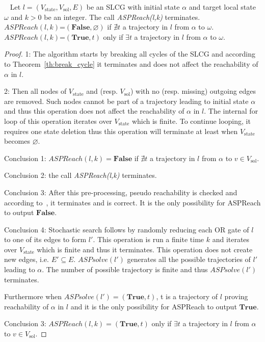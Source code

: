 \begin{theorem} ~
    Let $l=(V_{\mathrm{state}}, V_{\mathrm{sol}}, E)$ be an SLCG with initial state $\alpha$ and target local state $\omega$ and $k > 0$ be an integer.
    The call \textit{ASPReach(l,k)} terminates.\\
    $ASPReach(l,k)$=$(\mathbf{False},\varnothing)$ if $\nexists t$ a trajectory in $l$ from $\alpha$ to $\omega$.\\
    $ASPReach(l,k)$=$(\mathbf{True},t)$ only if $\exists t$ a trajectory in $l$ from $\alpha$ to $\omega$.
    \begin{proof}
    
        1: The algorithm starts by breaking all cycles of the SLCG and according to Theorem~\ref{th:break_cycle} it terminates and does not affect the reachability of $\alpha$ in $l$.
        
        2: Then all nodes of $V_{\mathrm{state}}$ and (resp. $V_{\mathrm{sol}}$) with no (resp. missing) outgoing edges are removed.
        Such nodes cannot be part of a trajectory leading to initial state $\alpha$ and thus this operation does not affect the reachability of $\alpha$ in $l$.
        The internal for loop of this operation iterates over $V_{\mathrm{state}}$ which is finite.
        To continue looping, it requires one state deletion thus this operation will terminate at least when $V_{\mathrm{state}}$ becomes $\varnothing$.
        
        Conclusion 1: $ASPReach(l,k)=\mathbf{False}$ if $\nexists t$ a trajectory in $l$ from $\alpha$ to $v \in V_{\mathrm{sol}}$.
        
        Conclusion 2: the call \textit{ASPReach(l,k)} terminates.
        
        Conclusion 3: After this pre-processing, pseudo reachability is checked and according to~\cite{pauleve2012}, it terminates and is correct.
        It is the only possibility for ASPReach to output $\mathbf{False}$.
        
        Conclusion 4: Stochastic search follows by randomly reducing each OR gate of $l$ to one of its edges to form $l'$.
        This operation is run a finite time $k$ and iterates over $V_{\mathrm{state}}$ which is finite and thus it terminates.
        This operation does not create new edges, i.e. $E' \subseteq E$.
        $ASPsolve(l')$ generates all the possible trajectories of $l'$ leading to $\alpha$.
        The number of possible trajectory is finite and thus $ASPsolve(l')$ terminates.
        
        Furthermore when $ASPsolve(l')=(\mathbf{True},t)$, t is a trajectory of $l$ proving reachability of $\alpha$ in $l$ and it is the only possibility for ASPReach to output $\mathbf{True}$.
        
        Conclusion 3: $ASPReach(l,k)=(\mathrm{\mathbf{True}},t)$ only if $\exists t$ a trajectory in $l$ from $\alpha$ to $v \in V_{\mathrm{sol}}$.
    \end{proof}
\end{theorem}

